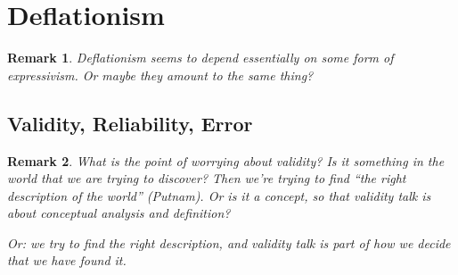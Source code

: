 \documentclass[11pt,twoside]{article}
\newtheorem{remark}{Remark}
\newcommand{\SR}{Survey Research}
\begin{document}
\begin{abstract}
The first part of the paper thus explores the plausibility of a
deflationary or minimalist concept of validity.  Not just logical
(inferential) validity, but validity as used by the social sciences,
as a property of referential relations.

The second part of the paper examines the notion of validity as used
in \SR{}.  Suffice it to say that vocabulary of validity in the social
sciences, especially psychology and education research, is very,
\textit{very} confused.  Generally speaking, the term is used to
refer, not to inferences and their properties, but to referential
relations.  Classic definitions of validity in the social sciences
usually say something like ``measures what it purports to measure'',
which is to say, measurement expressions (e.g. ``2.3 meters'')
\textit{refer} to entities (properties, relations) in the world.  But
it is also used to refer to inferences and a variety of other
concepts.



The connection between the first and second parts is that the social
sciences usually treat validity as a substantial property.  Theories
of validity often take on a metaphysical hue; they attempt to say what
validity \textit{is}, as if it were some kind of entity or substance
-- validity stuff -- that referring terms ``have'', possibly in
greater or lesser degrees.  On the deflationary view, this is a
mistake that inevitably leads to unresolvable problems.

\end{abstract}

\tableofcontents
\listoffigures

\section{Deflationism}

\begin{remark}
  Deflationism seems to depend essentially on some form of
  expressivism.  Or maybe they amount to the same thing?
\end{remark}

\subsection{Validity, Reliability, Error}
\label{sub:Validity}

\begin{remark}
What is the point of worrying about validity?  Is it something in the
world that we are trying to discover?  Then we're trying to find ``the
right description of the world'' (Putnam).  Or is it a concept, so
that validity talk is about conceptual analysis and definition?

Or: we try to find the right description, and validity talk is part of
how we decide that we have found it.

\end{remark}
\end{document}
